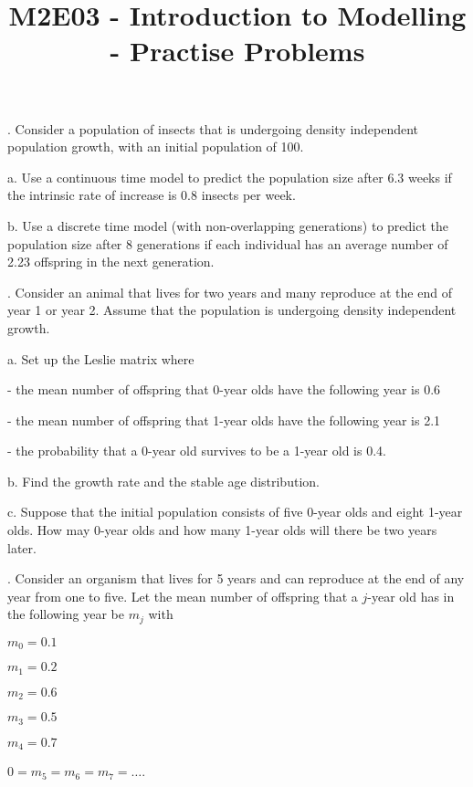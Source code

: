 \documentclass[reqno,12pt]{amsart}
\begin{document}
\title{M2E03 - Introduction to Modelling - Practise Problems}
\maketitle

.  Consider a population of insects that is undergoing density
independent population growth, with an initial population of 100.

\noindent
a.  Use a continuous time model to predict the population size
after 6.3 weeks if the intrinsic rate of increase is 0.8 insects
per week.

\noindent
b.  Use a discrete time model (with non-overlapping generations)
to predict the population size after 8 generations if each
individual has an average number of 2.23 offspring in the
next generation.

\vspace{1cm}

.  Consider an animal that lives for two years and many reproduce
at the end of year 1 or year 2.  Assume that the population is
undergoing density independent growth.

\noindent
a. Set up the Leslie matrix where

- the mean number of offspring that 0-year olds have the following
year is 0.6

- the mean number of offspring that 1-year olds have the following
year is 2.1

- the probability that a 0-year old survives to be a 1-year old
is 0.4.

\noindent
b.  Find the growth rate and the stable age distribution.

\noindent
c.  Suppose that the initial population consists of five 0-year
olds and eight 1-year olds.  How may 0-year olds and how many
1-year olds will there be two years later.

\vspace{1cm}

.  Consider an organism that lives for 5 years and can
reproduce at the end of any year from one to five.  Let
the mean number of offspring that a $j$-year old has in
the following year be $m_j$ with

$m_0 = 0.1$

$m_1 = 0.2$

$m_2 = 0.6$

$m_3 = 0.5$

$m_4 = 0.7$

$0 = m_5 = m_6 = m_7 = \dots$.
\end{document}
